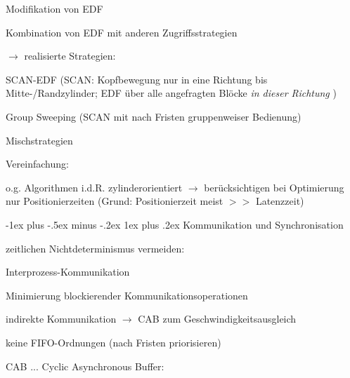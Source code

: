 \documentclass[a4paper]{article}
\makeatletter
\renewcommand{\subsubsection}{\@startsection{subsubsection}{3}{0mm}%
 {-1ex plus -.5ex minus -.2ex}%
 {1ex plus .2ex}%
 {\normalfont\small\bfseries}}
\makeatother
\begin{document}
\begin{multicols}{3}
\begin{itemize*}
\begin{enumerate*}
            \item Modifikation von EDF
            \item Kombination von EDF mit anderen Zugriffsstrategien
        \end{enumerate*}
    \end{itemize*}

    $\rightarrow$ realisierte Strategien:

    \begin{enumerate*}
        \item
        SCAN-EDF (SCAN: Kopfbewegung nur in eine Richtung bis
        Mitte-/Randzylinder; EDF über alle angefragten Blöcke \emph{in dieser
            Richtung} )
        \item
        Group Sweeping (SCAN mit nach Fristen gruppenweiser Bedienung)
        \item
        Mischstrategien
    \end{enumerate*}

    \begin{itemize*}
        \item
        Vereinfachung:
        \begin{itemize*}
            \item o.g. Algorithmen i.d.R. zylinderorientiert $\rightarrow$ berücksichtigen bei Optimierung nur Positionierzeiten (Grund: Positionierzeit meist $>>$ Latenzzeit)
        \end{itemize*}
    \end{itemize*}


    \subsubsection{Kommunikation und
        Synchronisation}

    \begin{itemize*}
        \item
        zeitlichen Nichtdeterminismus vermeiden:
        \begin{enumerate*}

            \item Interprozess-Kommunikation
        \end{enumerate*}
        \begin{itemize*}
            \item Minimierung blockierender Kommunikationsoperationen
            \item indirekte Kommunikation $\rightarrow$ CAB zum Geschwindigkeitsausgleich
            \item keine FIFO-Ordnungen (nach Fristen priorisieren)
            \item CAB ... Cyclic Asynchronous Buffer: %
        \end{itemize*}
        \begin{enumerate*}


\end{enumerate*}
\end{itemize*}
\end{multicols}
\end{document}
